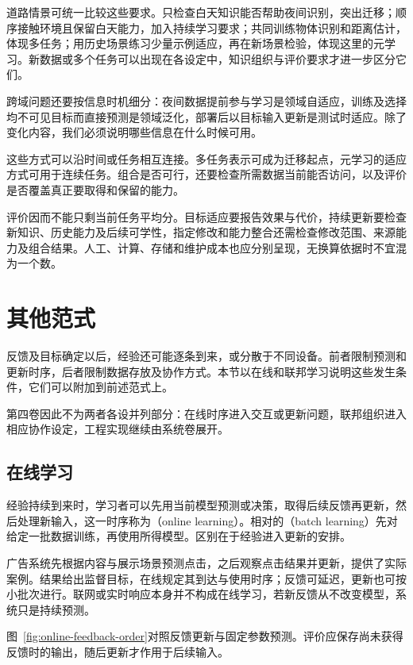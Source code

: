 道路情景可统一比较这些要求。只检查白天知识能否帮助夜间识别，突出迁移；顺序接触环境且保留白天能力，加入持续学习要求；共同训练物体识别和距离估计，体现多任务；用历史场景练习少量示例适应，再在新场景检验，体现这里的元学习。新数据或多个任务可以出现在各设定中，知识组织与评价要求才进一步区分它们。

跨域问题还要按信息时机细分：夜间数据提前参与学习是领域自适应，训练及选择均不可见目标而直接预测是领域泛化，部署后以目标输入更新是测试时适应。除了变化内容，我们必须说明哪些信息在什么时候可用。

这些方式可以沿时间或任务相互连接。多任务表示可成为迁移起点，元学习的适应方式可用于连续任务。组合是否可行，还要检查所需数据当前能否访问，以及评价是否覆盖真正要取得和保留的能力。

评价因而不能只剩当前任务平均分。目标适应要报告效果与代价，持续更新要检查新知识、历史能力及后续可学性，指定修改和能力整合还需检查修改范围、来源能力及组合结果。人工、计算、存储和维护成本也应分别呈现，无换算依据时不宜混为一个数。

\section{其他范式}
\label{sec:other-learning-settings}

反馈及目标确定以后，经验还可能逐条到来，或分散于不同设备。前者限制预测和更新时序，后者限制数据存放及协作方式。本节以在线和联邦学习说明这些发生条件，它们可以附加到前述范式上。

第四卷因此不为两者各设并列部分：在线时序进入交互或更新问题，联邦组织进入相应协作设定，工程实现继续由系统卷展开。

\subsection{在线学习}
\label{sec:online-learning}

经验持续到来时，学习者可以先用当前模型预测或决策，取得后续反馈再更新，然后处理新输入，这一时序称为（online learning）。相对的（batch learning）先对给定一批数据训练，再使用所得模型。区别在于经验进入更新的安排。

广告系统先根据内容与展示场景预测点击，之后观察点击结果并更新，提供了实际案例。结果给出监督目标，在线规定其到达与使用时序；反馈可延迟，更新也可按小批次进行。联网或实时响应本身并不构成在线学习，若新反馈从不改变模型，系统只是持续预测。

图~\ref{fig:online-feedback-order}对照反馈更新与固定参数预测。评价应保存尚未获得反馈时的输出，随后更新才作用于后续输入。

